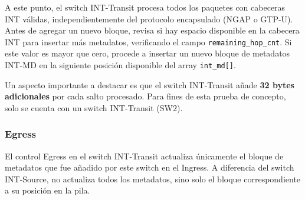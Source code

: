 A este punto, el switch INT-Transit procesa todos los paquetes con cabeceras INT válidas, independientemente del protocolo encapsulado (NGAP o GTP-U). Antes de agregar un nuevo bloque, revisa si hay espacio disponible en la cabecera INT para insertar más metadatos, verificando el campo \texttt{remaining\_hop\_cnt}. Si este valor es mayor que cero, procede a insertar un nuevo bloque de metadatos INT-MD en la siguiente posición disponible del array \texttt{int\_md[]}.

Un aspecto importante a destacar es que el switch INT-Transit añade \textbf{32 bytes adicionales} por cada salto procesado. Para fines de esta prueba de concepto, solo se cuenta con un switch INT-Transit (SW2).

\subsubsection{Egress}
El control Egress en el switch INT-Transit actualiza únicamente el bloque de metadatos que fue añadido por este switch en el Ingress. A diferencia del switch INT-Source, no actualiza todos los metadatos, sino solo el bloque correspondiente a su posición en la pila.

